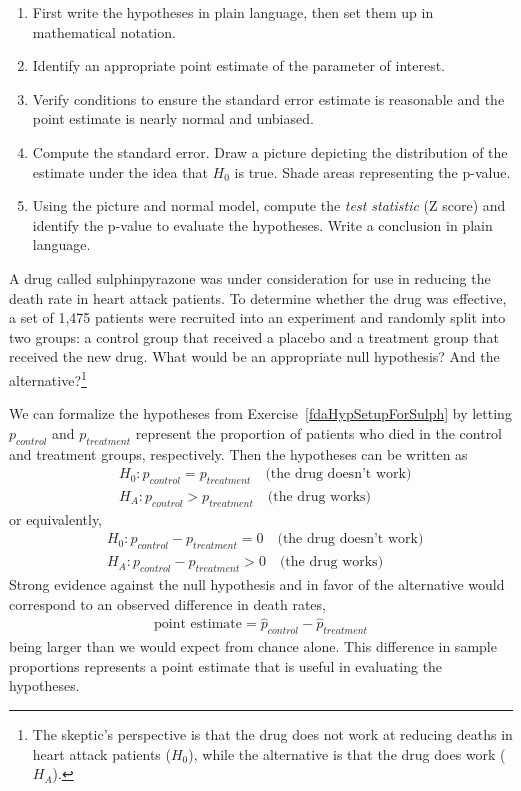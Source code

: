 {\begin{termBox}{
\begin{enumerate}
\setlength{\itemsep}{0mm}
\item First write the hypotheses in plain language, then set them up in mathematical notation.
\item Identify an appropriate point estimate of the parameter of interest.
\item Verify conditions to ensure the standard error estimate is reasonable and the point estimate is nearly normal and unbiased.
\item Compute the standard error. Draw a picture depicting the distribution of the estimate under the idea that $H_0$ is true. Shade areas representing the p-value.
\item Using the picture and normal model, compute the \emph{test statistic} (Z score) and identify the p-value to evaluate the hypotheses. Write a conclusion in plain language.
\end{enumerate}}
\end{termBox}

\begin{exercise} \label{fdaHypSetupForSulph}
A drug called sulphinpyrazone was under consideration for use in reducing the death rate in heart attack patients. To determine whether the drug was effective, a set of 1,475 patients were recruited into an experiment and randomly split into two groups: a control group that received a placebo and a treatment group that received the new drug. What would be an appropriate null hypothesis? And the alternative?\footnote{The skeptic's perspective is that the drug does not work at reducing deaths in heart attack patients ($H_0$), while the alternative is that the drug does work ($H_A$).}
\end{exercise}

We can formalize the hypotheses from Exercise~\ref{fdaHypSetupForSulph} by letting $p_{control}$ and $p_{treatment}$ represent the proportion of patients who died in the control and treatment groups, respectively. Then the hypotheses can be written as
\begin{eqnarray*}
&&H_0: p_{control} = p_{treatment} \quad\text{(the drug doesn't work)} \quad \\
&&H_A: p_{control} > p_{treatment} \quad\text{(the drug works)}
\end{eqnarray*}
or equivalently,
\begin{eqnarray*}
&&H_0: p_{control} - p_{treatment} = 0 \quad\text{(the drug doesn't work)} \quad \\
&&H_A: p_{control} - p_{treatment} > 0 \quad\text{(the drug works)}
\end{eqnarray*}
Strong evidence against the null hypothesis and in favor of the alternative would correspond to an observed difference in death rates,
\begin{eqnarray*}
\text{point estimate} = \hat{p}_{control} - \hat{p}_{treatment}
\end{eqnarray*}
being larger than we would expect from chance alone. This difference in sample proportions represents a point estimate that is useful in evaluating the hypotheses. 

}
